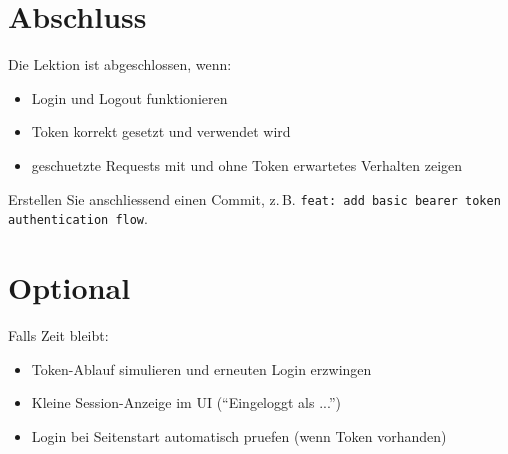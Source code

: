 \documentclass[a4paper,12pt]{article}
\begin{document}
\section{Abschluss}

Die Lektion ist abgeschlossen, wenn:
\begin{itemize}
    \item Login und Logout funktionieren
    \item Token korrekt gesetzt und verwendet wird
    \item geschuetzte Requests mit und ohne Token erwartetes Verhalten zeigen
\end{itemize}

Erstellen Sie anschliessend einen Commit, z.\,B.
\texttt{feat: add basic bearer token authentication flow}.

\section{Optional}

Falls Zeit bleibt:
\begin{itemize}
    \item Token-Ablauf simulieren und erneuten Login erzwingen
    \item Kleine Session-Anzeige im UI (``Eingeloggt als ...'')
    \item Login bei Seitenstart automatisch pruefen (wenn Token vorhanden)
\end{itemize}
\end{document}

